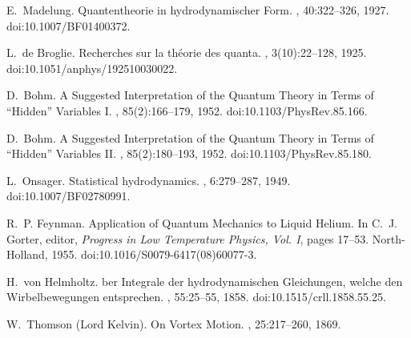 \documentclass[11pt,a4paper]{article}
\begin{document}
\begin{center}
\end{center}

\begin{thebibliography}{99}

E.~Madelung.
\newblock Quantentheorie in hydrodynamischer Form.
, 40:322--326, 1927.
\newblock doi:10.1007/BF01400372.

L.~de Broglie.
\newblock Recherches sur la th{\'e}orie des quanta.
, 3(10):22--128, 1925.
\newblock doi:10.1051/anphys/192510030022.

D.~Bohm.
\newblock A Suggested Interpretation of the Quantum Theory in Terms of ``Hidden'' Variables I.
, 85(2):166--179, 1952.
\newblock doi:10.1103/PhysRev.85.166.

D.~Bohm.
\newblock A Suggested Interpretation of the Quantum Theory in Terms of ``Hidden'' Variables II.
, 85(2):180--193, 1952.
\newblock doi:10.1103/PhysRev.85.180.

L.~Onsager.
\newblock Statistical hydrodynamics.
, 6:279--287, 1949.
\newblock doi:10.1007/BF02780991.

R.~P. Feynman.
\newblock Application of Quantum Mechanics to Liquid Helium.
\newblock In C.~J. Gorter, editor, {\em Progress in Low Temperature Physics, Vol. I}, pages 17--53. North-Holland, 1955.
\newblock doi:10.1016/S0079-6417(08)60077-3.

H.~von Helmholtz.
ber Integrale der hydrodynamischen Gleichungen, welche den Wirbelbewegungen entsprechen.
, 55:25--55, 1858.
\newblock doi:10.1515/crll.1858.55.25.

W.~Thomson (Lord Kelvin).
\newblock On Vortex Motion.
, 25:217--260, 1869.

\end{thebibliography}
\end{document}
